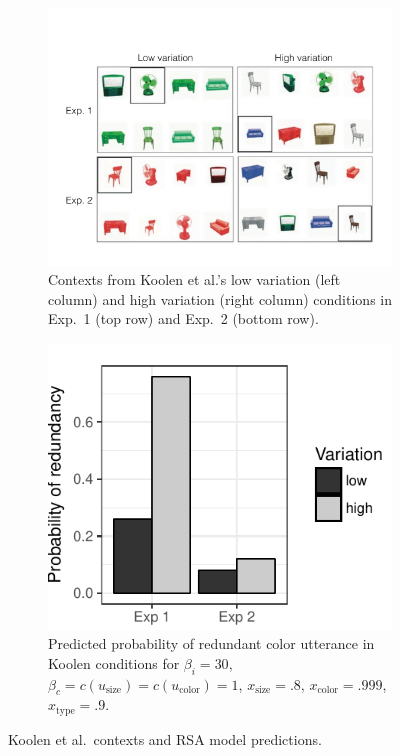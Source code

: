 \documentclass[11pt]{article}
\begin{document}
\begin{figure}
\begin{subfigure}{.5\textwidth}
\includegraphics[width=\textwidth]{pics/koolen-conditions}
\caption{Contexts from Koolen et al.'s low variation (left column) and high variation (right column) conditions in Exp.~1 (top row) and Exp.~2 (bottom row).}
\label{fig:koolencontexts}
\end{subfigure}
\begin{subfigure}{.5\textwidth}
\centering
\includegraphics[width=.75\textwidth]{pics/koolen-effect}
\caption{Predicted probability of redundant color utterance in Koolen conditions for $\beta_i = 30$, $ \beta_c = c(u_{\textrm{size}}) = c(u_{\textrm{color}}) = 1$, $x_{\text{size}} = .8$, $x_{\text{color}} = .999$, $x_{\text{type}} = .9$.}
\label{fig:koolensimulationresults}
\end{subfigure}
\caption{Koolen et al.~contexts and RSA model predictions.}
\end{figure}
\end{document}
